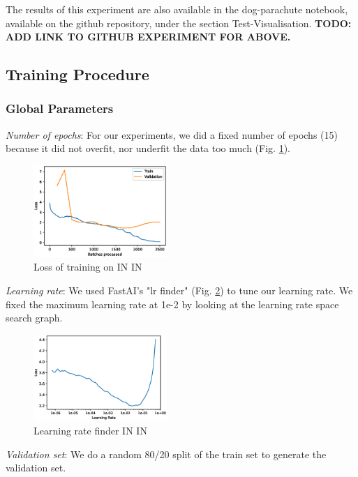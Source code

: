 \documentclass{article}
\begin{document}
\noindent
The results of this experiment are also available in the dog-parachute notebook, 
available on the github repository, under the section Test-Visualisation.
\textbf{TODO: ADD LINK TO GITHUB EXPERIMENT FOR ABOVE.}

\subsection{Training Procedure}


\subsubsection{Global Parameters}

\textit{Number of epochs}: For our experiments, we did a fixed number of epochs
 (15) because it did not overfit, nor underfit the data too much (Fig. \ref{loss_in}).

 \begin{figure}[h!]
  \includegraphics[width = 0.45\textwidth]{imgs/sin/loss}
  \caption{Loss of training on IN \texorpdfstring{\textrightarrow} .IN}
  \label{loss_in}
\end{figure}

\textit{Learning rate}: We used FastAI's "lr finder" (Fig. \ref{lr_finder}) to tune our learning rate.
We fixed the maximum learning rate at 1e-2 by looking at the learning rate space search graph.
\begin{figure}[h!]
  \includegraphics[width = 0.45\textwidth]{imgs/lr_find.eps}
  \caption{Learning rate finder IN \texorpdfstring{\textrightarrow} .IN}
  \label{lr_finder}
\end{figure}

\textit{Validation set}: We do a random 80/20 split of the train set to generate the 
validation set.
\end{document}
